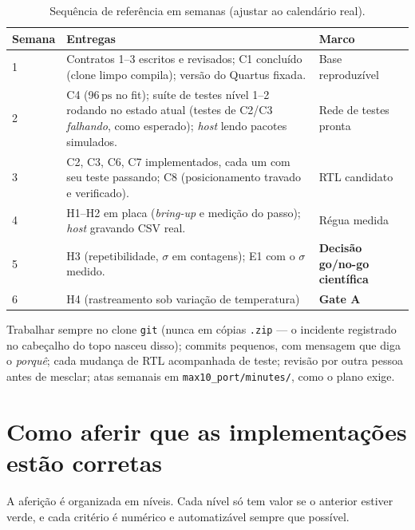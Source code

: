 \documentclass[11pt,a4paper]{article}
\newcommand{\ps}{\ensuremath{\,\mathrm{ps}}\xspace}
\newcommand{\file}[1]{\texttt{\small #1}}
\begin{document}
\begin{table}[H]
\centering
\caption{Sequência de referência em semanas (ajustar ao calendário real).}
\label{tab:sequencia}
\small
\begin{tabularx}{\textwidth}{@{}L{1.5cm} Y Y@{}}
\toprule
\textbf{Semana} & \textbf{Entregas} & \textbf{Marco} \\
 & Contratos 1--3 escritos e revisados; C1 concluído (clone limpo compila); versão do Quartus fixada. & Base reproduzível \\
2 & C4 (96\ps no fit); suíte de testes nível 1--2 rodando no estado atual (testes de C2/C3 \emph{falhando}, como esperado); \emph{host} lendo pacotes simulados. & Rede de testes pronta \\
3 & C2, C3, C6, C7 implementados, cada um com seu teste passando; C8 (posicionamento travado e verificado). & RTL candidato \\
4 & H1--H2 em placa (\emph{bring-up} e medição do passo); \emph{host} gravando CSV real. & Régua medida \\
5 & H3 (repetibilidade, $\sigma$ em contagens); E1 com o $\sigma$ medido. & \textbf{Decisão go/no-go científica} \\
6 & H4 (rastreamento sob variação de temperatura) & \textbf{Gate A} \\
\bottomrule
\end{tabularx}
\end{table}

\begin{notebox}[title={Regras de convivência no repositório}]
Trabalhar sempre no clone \texttt{git} (nunca em cópias \texttt{.zip} --- o incidente registrado
no cabeçalho do topo nasceu disso); commits pequenos, com mensagem que diga o \emph{porquê};
cada mudança de RTL acompanhada de teste; revisão por outra pessoa antes de mesclar; atas
semanais em \file{max10\_port/minutes/}, como o plano exige.
\end{notebox}

\section{Como aferir que as implementações estão corretas}
\label{sec:afericao}

A aferição é organizada em níveis. Cada nível só tem valor se o anterior estiver verde, e
cada critério é numérico e automatizável sempre que possível.
\end{document}
